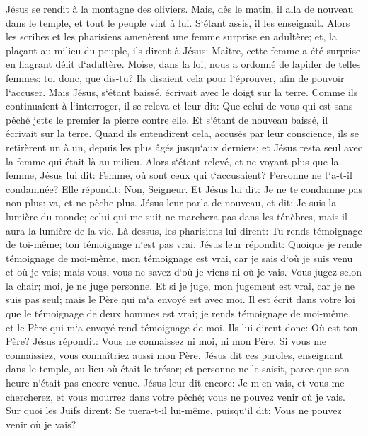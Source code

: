 \verse Jésus se rendit à la montagne des oliviers. 
\verse Mais, dès le matin, il alla de nouveau dans le temple, et tout le peuple vint à lui. S`étant assis, il les enseignait. 
\verse Alors les scribes et les pharisiens amenèrent une femme surprise en adultère; 
\verse et, la plaçant au milieu du peuple, ils dirent à Jésus: Maître, cette femme a été surprise en flagrant délit d`adultère. 
\verse Moïse, dans la loi, nous a ordonné de lapider de telles femmes: toi donc, que dis-tu? 
\verse Ils disaient cela pour l`éprouver, afin de pouvoir l`accuser. Mais Jésus, s`étant baissé, écrivait avec le doigt sur la terre. 
\verse Comme ils continuaient à l`interroger, il se releva et leur dit: Que celui de vous qui est sans péché jette le premier la pierre contre elle. 
\verse Et s`étant de nouveau baissé, il écrivait sur la terre. 
\verse Quand ils entendirent cela, accusés par leur conscience, ils se retirèrent un à un, depuis les plus âgés jusqu`aux derniers; et Jésus resta seul avec la femme qui était là au milieu. 
\verse Alors s`étant relevé, et ne voyant plus que la femme, Jésus lui dit: Femme, où sont ceux qui t`accusaient? Personne ne t`a-t-il condamnée? 
\verse Elle répondit: Non, Seigneur. Et Jésus lui dit: Je ne te condamne pas non plus: va, et ne pèche plus. 
\verse Jésus leur parla de nouveau, et dit: Je suis la lumière du monde; celui qui me suit ne marchera pas dans les ténèbres, mais il aura la lumière de la vie. 
\verse Là-dessus, les pharisiens lui dirent: Tu rends témoignage de toi-même; ton témoignage n`est pas vrai. 
\verse Jésus leur répondit: Quoique je rende témoignage de moi-même, mon témoignage est vrai, car je sais d`où je suis venu et où je vais; mais vous, vous ne savez d`où je viens ni où je vais. 
\verse Vous jugez selon la chair; moi, je ne juge personne. 
\verse Et si je juge, mon jugement est vrai, car je ne suis pas seul; mais le Père qui m`a envoyé est avec moi. 
\verse Il est écrit dans votre loi que le témoignage de deux hommes est vrai; 
\verse je rends témoignage de moi-même, et le Père qui m`a envoyé rend témoignage de moi. 
\verse Ils lui dirent donc: Où est ton Père? Jésus répondit: Vous ne connaissez ni moi, ni mon Père. Si vous me connaissiez, vous connaîtriez aussi mon Père. 
\verse Jésus dit ces paroles, enseignant dans le temple, au lieu où était le trésor; et personne ne le saisit, parce que son heure n`était pas encore venue. 
\verse Jésus leur dit encore: Je m`en vais, et vous me chercherez, et vous mourrez dans votre péché; vous ne pouvez venir où je vais. 
\verse Sur quoi les Juifs dirent: Se tuera-t-il lui-même, puisqu`il dit: Vous ne pouvez venir où je vais? 
